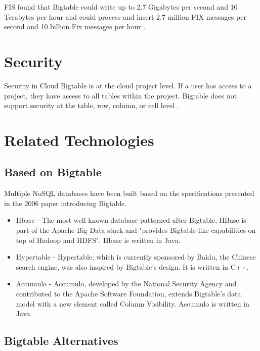 \documentclass[9pt,twocolumn,twoside]{styles/osajnl}
\begin{document}
FIS found that Bigtable could write up to 2.7 Gigabytes per second and 10 Terabytes per hour and could process and insert 2.7 million FIX messages per second and 10 billion Fix messages per hour \cite{www-fis}.

\section{Security}

Security in Cloud Bigtable is at the cloud project level. If a user has access to a project, they have access to all tables within the project. Bigtable does not support security at the table, row, column, or cell level \cite{www-bigtabledocoverview}.

\section{Related Technologies}

\subsection{Based on Bigtable}

Multiple NoSQL databases have been built based on the specifications presented in the 2006 paper introducing Bigtable.

\vspace{-\topsep}
\begin{itemize}
\item Hbase \cite{www-hbase} - The most well known database patterned after Bigtable, HBase is part of the Apache Big Data stack and "provides Bigtable-like capabilities on top of Hadoop and HDFS"\cite{www-hbase}.  Hbase is written in Java.
\item Hypertable \cite{www-wikihypertable} - Hypertable, which is currently sponsored by Baidu, the Chinese search engine, was also inspired by Bigtable's design.  It is written in C++.
\item Accumulo \cite{www-wikiaccumulo} - Accumulo, developed by the National Security Agency and contributed to the Apache Software Foundation, extends Bigtable's data model with a new element called Column Visibility.  Accumulo is written in Java.
\end{itemize}
\vspace{-\topsep}

\subsection{Bigtable Alternatives}
\end{document}
